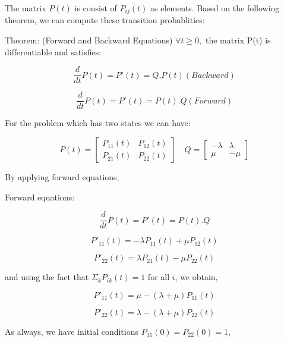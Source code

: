 \documentclass[12pt,letterpaper]{article}
\begin{document}
The matrix $P(t)$ is consist of $P_{ij}(t)$ as elements. Based on the following theorem, we can compute these transition probablities:

Theorem: (Forward and Backward Equations) $\forall t\geq 0,$ the matrix P(t) is differentiable and satisfies:

\begin{equation}
\frac{d}{dt}P(t)=P'(t)= Q.P(t) (Backward)
\end{equation}

\begin{equation}
\frac{d}{dt}P(t)=P'(t)= P(t).Q (Forward)
\end{equation}


For the problem which has two states we can have:

\[
P(t)=                                       
\begin{bmatrix} 
P_{11}(t) & P_{12}(t) \\
P_{21}(t) & P_{22}(t)
\end{bmatrix}\quad
Q=
\begin{bmatrix} 
-\lambda & \lambda \\
\mu & -\mu 
\end{bmatrix}
\]

By applying forward equations,


Forward equations:


\begin{equation}
\frac{d}{dt}P(t)=P'(t)= P(t).Q 
\end{equation}

\begin{equation}
P'_{11}(t)=-\lambda P_{11}(t)+\mu P_{12}(t)
\end{equation}

\begin{equation}
P'_{22}(t)=\lambda P_{21}(t)-\mu P_{22}(t)
\end{equation}

and using the fact that $\Sigma_k P_{ik}(t)=1$ for all $i$, we obtain,


\begin{equation}
P'_{11}(t)=\mu-(\lambda +\mu) P_{11}(t)
\end{equation}

\begin{equation}
P'_{22}(t)=\lambda-(\lambda +\mu) P_{22}(t)
\end{equation}


As always, we have initial conditions $P_{11}(0)=P_{22}(0)=1$,
\end{document}
